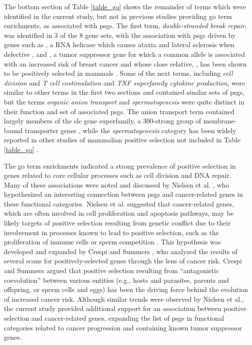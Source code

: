 The bottom section of Table \ref{table_go} shows the remainder of
terms which were identified in the current study, but not in previous
studies providing \ac{go} term enrichments, as associated with
\acp{psg}. The first term, \emph{double-stranded break repair}, was
identified in 3 of the 8 gene sets, with the association with
\acp{psg} driven by genes such as , a RNA helicase which
causes ataxia and lateral sclerosis when defective
\citep{Suraweera2007}, and , a tumor suppressor gene for
which a common allele is associated with an increased risk of breast
cancer and whose close relative, , has been shown to be
positively selected in mammals \citep{Huttley2000a}. Some of the next
terms, including \emph{cell division} and \emph{T cell costimulation}
and \emph{TNF superfamily cytokine production}, were similar to other
terms in the first two sections and contained similar sets of
\acp{psg}, but the terms \emph{organic anion transport} and
\emph{spermatogenesis} were quite distinct in their function and set
of associated \acp{psg}. The anion transport term contained largely
members of the \ac{slc} gene superfamily, a 300-strong group of
membrane-bound transporter genes \citep{He2009}, while the
\emph{spermatogenesis} category has been widely reported in other
studies of mammalian positive selection not included in Table
\ref{table_go}
\citep{Torgerson2002,Swanson2003,Clark2005,Nielsen2005}.

The \ac{go} term enrichments indicated a strong prevalence of positive
selection in genes related to core cellular processes such as cell
division and DNA repair. Many of these associations were noted and
discussed by Nielsen et al. \citeyearpar{Nielsen2005}, who
hypothesized an interesting connection between \acp{psg} and
cancer-related genes in these functional categories. Nielsen et al.
suggested that cancer-related genes, which are often involved in cell
proliferation and apoptosis pathways, may be likely targets of
positive selection resulting from genetic conflict due to their
involvement in processes known to lead to positive selection, such as
the proliferation of immune cells \citep{Sawyer2005a} or sperm
competition \citep{Torgerson2002,Clark2005}. This hypothesis was
developed and expanded by Crespi and Summers \citeyearpar{Crespi2006},
who analyzed the results of several scans for positively-selected
genes through the lens of cancer risk. Crespi and Summers argued that
positive selection resulting from ``antagonistic coevolution'' between
various entities (e.g., hosts and parasites, parents and offspring, or
sperm cells and eggs) has been the driving force behind the evolution
of increased cancer risk. Although similar trends were observed by
Nielsen et al., the current study provided additional support for an
association between positive selection and cancer-related genes,
expanding the list of \acp{psg} in functional categories related to
cancer progression and containing known tumor suppressor genes.

